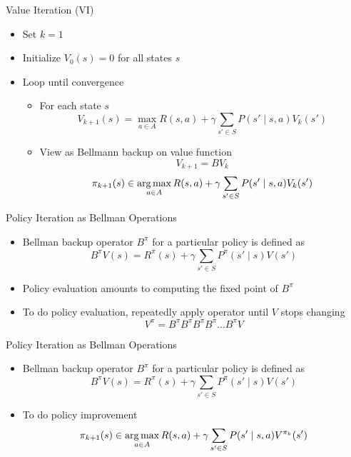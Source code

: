 \begin{frame}[c]{Value Iteration (VI)}

\begin{itemize}
	\item  Set $k = 1$
	\item Initialize $V_0(s) = 0$ for all states $s$
	\item Loop until convergence
	\begin{itemize}
		\item For each state $s$
		$$V_{k+1}(s) = \max_{a\in A } R(s,a) + \gamma \sum_{s' \in S } P(s' \mid s,a) V_k(s') $$
		\item View as Bellmann backup on value function
		$$V_{k+1} = BV_k$$
		$$\pi_{k+1}(s) \in \operatorname*{arg\,max}_{a \in A} R(s,a) + \gamma \sum_{s' \in S} P(s' \mid s,a) V_k(s') $$
	\end{itemize}
	
\end{itemize}

\end{frame}
\begin{frame}[c]{Policy Iteration as Bellman Operations}

\begin{itemize}
	\item  Bellman backup operator $B^\pi$ for a particular policy is defined as
	$$ B^\pi V (s) = R^\pi (s) + \gamma \sum_{s' \in S}  P^\pi(s' \mid s ) V (s')  $$
	\item Policy evaluation amounts to computing the fixed point of $B^\pi$
	\item To do policy evaluation, repeatedly apply operator until $V$ stops changing
	$$V^\pi = B^\pi B^\pi B^\pi B^\pi \ldots B^\pi V$$
	\end{itemize}

\end{frame}
\begin{frame}[c]{Policy Iteration as Bellman Operations}

\begin{itemize}
	\item  Bellman backup operator $B^\pi$ for a particular policy is defined as
	$$ B^\pi V (s) = R^\pi (s) + \gamma \sum_{s' \in S}  P^\pi(s' \mid s ) V (s')  $$
	\item To do policy improvement
	$$ \pi_{k+1} (s) \in \operatorname*{arg\,max}_{a \in A} R(s,a) + \gamma \sum_{s'\in S} P(s' \mid s,a) V^{\pi_{k}}(s')$$

\end{itemize}

\end{frame}
